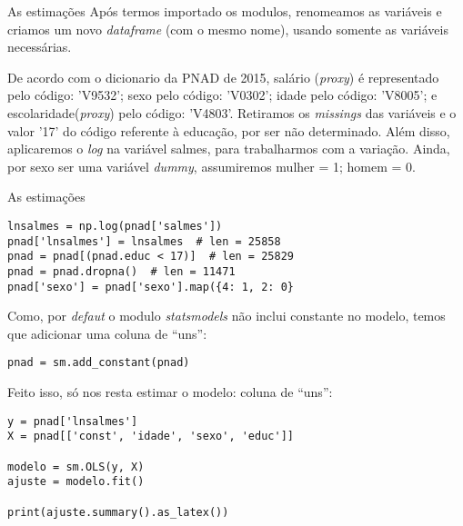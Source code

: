 \documentclass[11pt]{beamer}
\begin{document}
\begin{frame}[fragile]{As estimações}
Após termos importado os modulos, renomeamos as variáveis e criamos um novo \textit{dataframe} (com o mesmo nome), usando somente as variáveis necessárias.\\
\begin{block}{De acordo com o dicionario da PNAD de 2015, salário (\textit{proxy}) é representado pelo código: 'V9532'; sexo pelo código: 'V0302'; idade pelo código: 'V8005'; e escolaridade(\textit{proxy}) pelo código: 'V4803'. Retiramos os \textit{missings} das variáveis e o valor '17' do código referente à educação, por ser não determinado. Além disso, aplicaremos o \textit{log} na variável salmes, para trabalharmos com a variação. Ainda, por sexo ser uma variável \textit{dummy}, assumiremos mulher = 1; homem = 0.}
\end{block}
\end{frame}

\begin{frame}[fragile]{As estimações}
\begin{lstlisting}
lnsalmes = np.log(pnad['salmes'])
pnad['lnsalmes'] = lnsalmes  # len = 25858
pnad = pnad[(pnad.educ < 17)]  # len = 25829
pnad = pnad.dropna()  # len = 11471
pnad['sexo'] = pnad['sexo'].map({4: 1, 2: 0}
\end{lstlisting}

Como, por \textit{defaut} o modulo \textit{statsmodels} não inclui constante no modelo, temos que adicionar uma coluna de ``uns'':
\begin{lstlisting}
pnad = sm.add_constant(pnad)
\end{lstlisting}
Feito isso, só nos resta estimar o modelo:
coluna de ``uns'':
\begin{lstlisting}
y = pnad['lnsalmes']
X = pnad[['const', 'idade', 'sexo', 'educ']]

modelo = sm.OLS(y, X)
ajuste = modelo.fit()

print(ajuste.summary().as_latex())
\end{lstlisting}
\end{frame}
\end{document}
